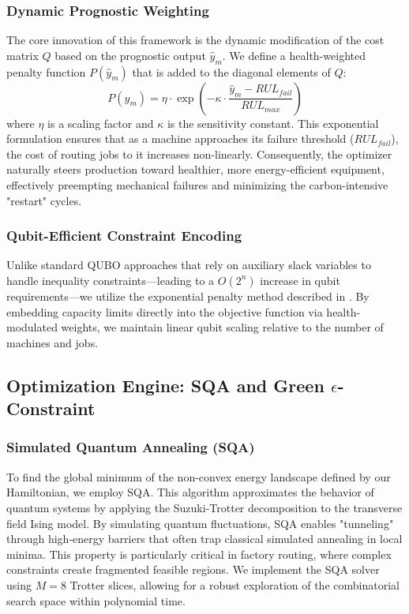 \documentclass[conference]{IEEEtran}
\begin{document}
\subsubsection{Dynamic Prognostic Weighting}
The core innovation of this framework is the dynamic modification of the cost matrix $Q$ based on the prognostic output $\hat{y}_m$. We define a health-weighted penalty function $P(\hat{y}_m)$ that is added to the diagonal elements of $Q$:
\begin{equation}
  P(\hat{y}_m) = \eta \cdot \exp\left( -\kappa \cdot \frac{\hat{y}_m - RUL_{fail}}{RUL_{max}} \right)
\end{equation}
where $\eta$ is a scaling factor and $\kappa$ is the sensitivity constant. This exponential formulation ensures that as a machine approaches its failure threshold ($RUL_{fail}$), the cost of routing jobs to it increases non-linearly. Consequently, the optimizer naturally steers production toward healthier, more energy-efficient equipment, effectively preempting mechanical failures and minimizing the carbon-intensive "restart" cycles.

\subsubsection{Qubit-Efficient Constraint Encoding}
Unlike standard QUBO approaches that rely on auxiliary slack variables to handle inequality constraints—leading to a $O(2^n)$ increase in qubit requirements—we utilize the exponential penalty method described in \cite{ref13}. By embedding capacity limits directly into the objective function via health-modulated weights, we maintain linear qubit scaling relative to the number of machines and jobs.

\subsection{Optimization Engine: SQA and Green $\epsilon$-Constraint}

\subsubsection{Simulated Quantum Annealing (SQA)}
To find the global minimum of the non-convex energy landscape defined by our Hamiltonian, we employ SQA. This algorithm approximates the behavior of quantum systems by applying the Suzuki-Trotter decomposition to the transverse field Ising model. By simulating quantum fluctuations, SQA enables "tunneling" through high-energy barriers that often trap classical simulated annealing in local minima. This property is particularly critical in factory routing, where complex constraints create fragmented feasible regions. We implement the SQA solver using $M=8$ Trotter slices, allowing for a robust exploration of the combinatorial search space within polynomial time.
\end{document}
